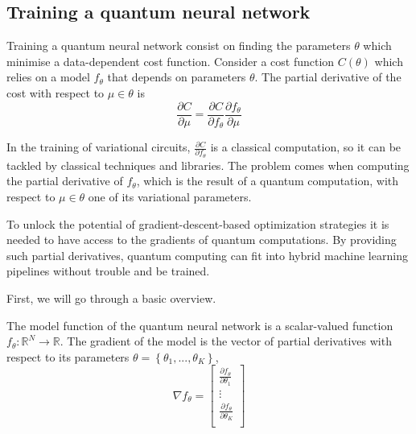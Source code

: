 \subsection{Training a quantum neural network}
Training a quantum neural network consist on finding the parameters $\theta$ which minimise a data-dependent cost function. Consider a cost function $C(\theta)$ which relies on a model $f_{\theta}$ that depends on parameters $\theta$. The partial derivative of the cost with respect to $\mu \in \theta$ is
\begin{equation}
    \frac{\partial C}{\partial \mu} = \frac{\partial C}{\partial f_{\theta}} \frac{\partial f_{\theta}}{\partial \mu}
\end{equation}

In the training of variational circuits, $\frac{\partial C}{\partial f_{\theta}}$ is a classical computation, so it can be tackled by classical techniques and libraries. The problem comes when computing the partial derivative of $f_{\theta}$, which is the result of a quantum computation, with respect to $\mu \in \theta$ one of its variational parameters.

To unlock the potential of gradient-descent-based optimization strategies it is needed to have access to the gradients of quantum computations. By providing such partial derivatives, quantum computing can fit into hybrid machine learning pipelines without trouble and be trained.

First, we will go through a basic overview.

The model function of the quantum neural network is a scalar-valued function ${f_{\theta}: \mathbb{R}^N \longrightarrow \mathbb{R}}$. The gradient of the model is the vector of partial derivatives with respect to its parameters $\theta=\left\lbrace \theta_1,...,\theta_K\right\rbrace$,
\begin{equation}
    \nabla f_{\theta}= 
     \begin{bmatrix}
    \frac{\partial f_{\theta}}{\partial \theta_1}\\
    \vdots \\
    \frac{\partial f_{\theta}}{\partial \theta_K}\\
    \end{bmatrix}
\end{equation}


